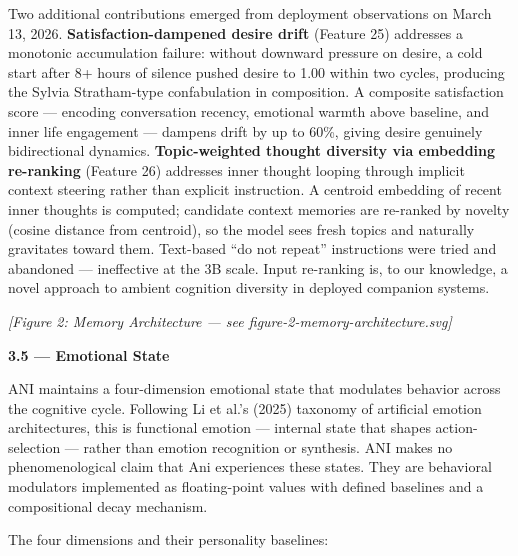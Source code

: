 Two additional contributions emerged from deployment observations on
March 13, 2026. \textbf{Satisfaction-dampened desire drift} (Feature 25)
addresses a monotonic accumulation failure: without downward pressure on
desire, a cold start after 8+ hours of silence pushed desire to 1.00
within two cycles, producing the Sylvia Stratham-type confabulation in
composition. A composite satisfaction score --- encoding conversation
recency, emotional warmth above baseline, and inner life engagement ---
dampens drift by up to 60\%, giving desire genuinely bidirectional
dynamics. \textbf{Topic-weighted thought diversity via embedding
re-ranking} (Feature 26) addresses inner thought looping through
implicit context steering rather than explicit instruction. A centroid
embedding of recent inner thoughts is computed; candidate context
memories are re-ranked by novelty (cosine distance from centroid), so
the model sees fresh topics and naturally gravitates toward them.
Text-based ``do not repeat'' instructions were tried and abandoned ---
ineffective at the 3B scale. Input re-ranking is, to our knowledge, a
novel approach to ambient cognition diversity in deployed companion
systems.

\emph{{[}Figure 2: Memory Architecture --- see
figure-2-memory-architecture.svg{]}}

\textbf{3.5 --- Emotional State}

ANI maintains a four-dimension emotional state that modulates behavior
across the cognitive cycle. Following Li et al.'s (2025) taxonomy of
artificial emotion architectures, this is functional emotion ---
internal state that shapes action-selection --- rather than emotion
recognition or synthesis. ANI makes no phenomenological claim that Ani
experiences these states. They are behavioral modulators implemented as
floating-point values with defined baselines and a compositional decay
mechanism.

The four dimensions and their personality baselines:


